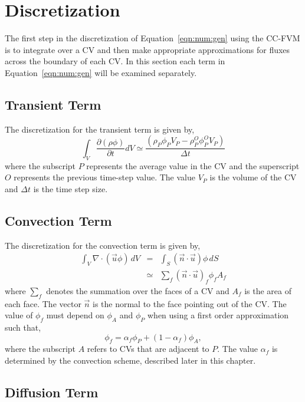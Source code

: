 \section{Discretization}

The first step in the discretization of Equation~\eqref{eqn:num:gen}
using the CC-FVM is to integrate over a CV and then make appropriate
approximations for fluxes across the boundary of each CV.  In this
section each term in Equation~\eqref{eqn:num:gen} will be examined
separately.

\subsection{Transient Term}

The discretization for the transient term is given by,
\begin{equation}
\int_V \frac{\partial (\rho \phi)}{\partial t} dV
\simeq
\frac{(\rho_{P} \phi_{P} V_P- \rho_P^O \phi_P^O V_P)}{\Delta t}
\label{eqn:num:tra}
\end{equation}
where the subscript $P$ represents the average value in the CV and
the superscript $O$ represents the previous time-step value.  The
value $V_P$ is the volume of the CV and $\Delta t$ is the time step
size.

\subsection{Convection Term}

The discretization for the convection term is given by,
\begin{eqnarray}
\int_V \nabla \cdot (\vec{u} \phi)\,dV & = & 
\int_S (\vec{n} \cdot \vec{u})\phi\,dS \\
& \simeq & \sum_{f} (\vec{n} \cdot \vec{u})_f \phi_f A_f
\label{eqn:num:con}
\end{eqnarray}
where $\sum_{f}$ denotes the summation over the faces of a CV and
$A_f$ is the area of each face.  The vector $\vec{n}$ is the normal to
the face pointing out of the CV. The value of $\phi_f$ must depend on
$\phi_A$ and $\phi_P$ when using a first order approximation such
that,
\begin{equation}
\phi_f=\alpha_f \phi_P +(1-\alpha_f)\phi_A,
\end{equation}
where the subscript $A$ refers to CVs that are adjacent to $P$.  The
value $\alpha_f$ is determined by the convection scheme, described
later in this chapter.

\subsection{Diffusion Term}

